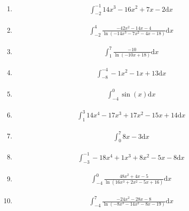\documentclass{article}
\begin{document}
\begin{enumerate}
	\item
		\begin{gather*}
			\int_{-2}^{-1} 14x^{3}-16x^{2}+7x-2 \mathrm{d}x
		\end{gather*}
	\item
		\begin{gather*}
			\int_{-2}^{4} \frac{-42x^{2}-14x-4}{\ln{(-14x^{3}-7x^{2}-4x-18)}} \mathrm{d}x
		\end{gather*}
	\item
		\begin{gather*}
			\int_{1}^{7} \frac{-10}{\ln{(-10x+18)}} \mathrm{d}x
		\end{gather*}
	\item
		\begin{gather*}
			\int_{-8}^{-4} -1x^{2}-1x+13 \mathrm{d}x
		\end{gather*}
	\item
		\begin{gather*}
			\int_{-4}^{0} \sin(x) \mathrm{d}x
		\end{gather*}
	\item
		\begin{gather*}
			\int_{1}^{3} 14x^{4}-17x^{3}+17x^{2}-15x+14 \mathrm{d}x
		\end{gather*}
	\item
		\begin{gather*}
			\int_{0}^{7} 8x-3 \mathrm{d}x
		\end{gather*}
	\item
		\begin{gather*}
			\int_{-3}^{-1} -18x^{4}+1x^{3}+8x^{2}-5x-8 \mathrm{d}x
		\end{gather*}
	\item
		\begin{gather*}
			\int_{-4}^{0} \frac{48x^{2}+4x-5}{\ln{(16x^{3}+2x^{2}-5x+16)}} \mathrm{d}x
		\end{gather*}
	\item
		\begin{gather*}
			\int_{-4}^{7} \frac{-24x^{2}-28x-8}{\ln{(-8x^{3}-14x^{2}-8x-19)}} \mathrm{d}x
		\end{gather*}
\end{enumerate}
\end{document}

